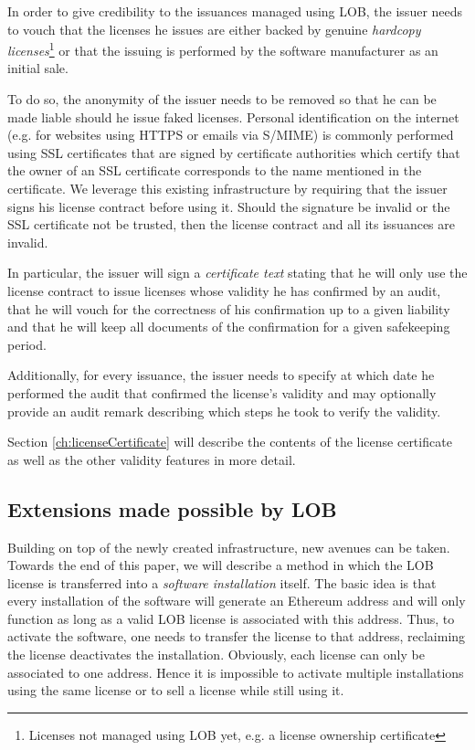 \documentclass[a4paper]{article}
\begin{document}
In order to give credibility to the issuances managed using LOB, the issuer needs to vouch that the licenses he issues are either backed by genuine \emph{hardcopy licenses}\footnote{Licenses not managed using LOB yet, e.g. a license ownership certificate} or that the issuing is performed by the software manufacturer as an initial sale. 

To do so, the anonymity of the issuer needs to be removed so that he can be made liable should he issue faked licenses. Personal identification on the internet (e.g. for websites using HTTPS or emails via S/MIME) is commonly performed using SSL certificates that are signed by certificate authorities which certify that the owner of an SSL certificate corresponds to the name mentioned in the certificate.
We leverage this existing infrastructure by requiring that the issuer signs his license contract before using it. Should the signature be invalid or the SSL certificate not be trusted, then the license contract and all its issuances are invalid.

In particular, the issuer will sign a \emph{certificate text} stating that he will only use the license contract to issue licenses whose validity he has confirmed by an audit, that he will vouch for the correctness of his confirmation up to a given liability and that he will keep all documents of the confirmation for a given safekeeping period.

Additionally, for every issuance, the issuer needs to specify at which date he performed the audit that confirmed the license's validity and may optionally provide an audit remark describing which steps he took to verify the validity.

Section \ref{ch:licenseCertificate} will describe the contents of the license certificate as well as the other validity features in more detail.





\subsection{Extensions made possible by LOB}
\label{ch:extensionsOverview}

Building on top of the newly created infrastructure, new avenues can be taken. Towards the end of this paper, we will describe a method in which the LOB license is transferred into a \emph{software installation} itself. The basic idea is that every installation of the software will generate an Ethereum address and will only function as long as a valid LOB license is associated with this address. Thus, to activate the software, one needs to transfer the license to that address, reclaiming the license deactivates the installation. Obviously, each license can only be associated to one address. Hence it is impossible to activate multiple installations using the same license or to sell a license while still using it.
\end{document}
